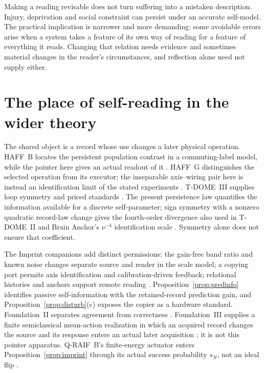 \documentclass[11pt,a4paper]{article}
\begin{document}
Making a reading revisable does not turn suffering into a mistaken description. Injury, deprivation and social constraint can persist under an accurate self-model. The practical implication is narrower and more demanding: some avoidable errors arise when a system takes a feature of its own way of reading for a feature of everything it reads. Changing that relation needs evidence and sometimes material changes in the reader's circumstances, and reflection alone need not supply either.

\section{The place of self-reading in the wider theory}\label{sec:wider}

The shared object is a record whose use changes a later physical operation.
HAFF~B locates the persistent population contrast in a commuting-label
model, while the pointer here gives an actual readout of it
\cite{HAFFB}. HAFF~G distinguishes the selected operation from its
executor; the inseparable axis--wiring pair here is instead an
identification limit of the stated experiments \cite{HAFFG}.
T-DOME~III supplies loop symmetry and priced standards
\cite{TDIII}. The present persistence law quantifies the information
available for a discrete self-parameter; sign symmetry with a nonzero
quadratic record-law change gives the fourth-order divergence also
used in T-DOME~II and Brain Anchor's $\nu^{-4}$ identification scale
\cite{TDII,BrainAnchor}. Symmetry alone does not ensure that coefficient.

The Imprint companions add distinct permissions: the gain-free band
ratio and known noise changes separate source and reader in the scale
model; a copying port permits axis identification and calibration-driven
feedback; relational histories and anchors support remote reading
\cite{ImprintRG,ImprintChain,StableHulls}.
Proposition~\ref{prop:predinfo} identifies passive self-information with
the retained-record prediction gain, and
Proposition~\ref{prop:disturb}(c) exposes the copier as a hardware standard.
Foundation~II separates agreement from correctness
\cite{FoundationII}. Foundation~III supplies a finite semiclassical
mean-action realization in which an acquired record changes the source
and its response enters an actual later acquisition
\cite{FoundationIII}; it is not this pointer apparatus.
Q-RAIF~B's finite-energy actuator enters
Proposition~\ref{prop:imprint} through its actual success probability
$s_N$, not an ideal flip \cite{QRAIFB}.
\end{document}
